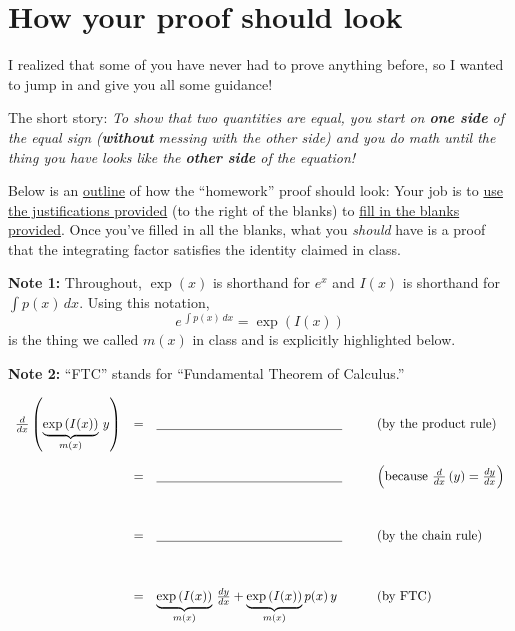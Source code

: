 \documentclass[12pt]{article}
\begin{document}
	\section*{\centering How your proof should look}
	\vspace{3mm}
	{\small{
	I realized that some of you have never had to prove anything before, so I wanted to jump in and give you all some guidance! 
	
	The short story: \textit{To show that two quantities are equal, you start on \textbf{one side} of the equal sign (\textbf{without} messing with the other side) and you do math until the thing you have looks like the \textbf{other side} of the equation!}
			
	Below is an \ul{outline} of how the ``homework'' proof should look: Your job is to \ul{use the justifications provided} (to the right of the blanks) to \ul{fill in the blanks provided}. Once you've filled in all the blanks, what you \textit{should} have is a proof that the integrating factor satisfies the identity claimed in class.
	
	\vspace{2.25mm}
	\noindent\textbf{Note 1:} Throughout, $\exp(x)$ is shorthand for $e^x$ and $I(x)$ is shorthand for $\int p(x)\,dx$. Using this notation,
	$$e^{\,\int p(x)\,dx}=\exp\left(I(x)\right)$$
	is the thing we called $m(x)$ in class and is explicitly highlighted below.

	\vspace{2.25mm}
	\noindent\textbf{Note 2:} ``FTC'' stands for ``Fundamental Theorem of Calculus.''}}
	
	\vspace{12mm}
	\begin{tcolorbox}
		[
		enhanced,
		colback=white,
		colframe=white,
		boxrule=0.5pt,
		arc=0pt,
		top=4.5mm,
		bottom=4.5mm, 
		grow to left by=0.375cm,
		grow to right by=0.375cm,
		enlarge bottom by=0mm,
		center
		]
		\begin{center}
			$\begin{array}{rcll}
				\frac{d}{dx}\left(\underbrace{\exp\left(I(x)\right)}_{m(x)}\,y\right) & = & \underline{\hspace{2in}}\hspace{6mm}&\left(\text{by the product rule}\right)\\[9mm]
					 & = & \underline{\hspace{2in}}\hspace{6mm}&\left(\text{because } \frac{d}{dx}\left(y\right)=\frac{dy}{dx}\right)\\[12mm]
					 & = & \underline{\hspace{2in}}\hspace{6mm}&\left(\text{by the chain rule}\right)\\[12mm]
					 & = & \underbrace{\exp\left(I(x)\right)}_{m(x)}\,\frac{dy}{dx}+\underbrace{\exp\left(I(x)\right)}_{m(x)}p(x)\,y\hspace{6mm}&\left(\text{by FTC}\right)
			\end{array}$
		\end{center}
	\end{tcolorbox}
	\vspace{3mm}
	\vspace*{\fill}%
\end{document}
